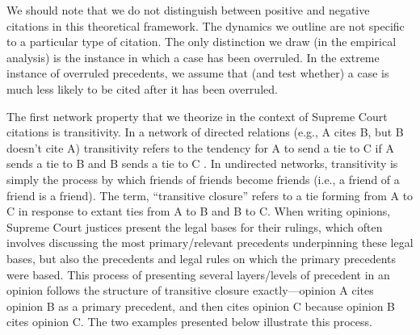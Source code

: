 \documentclass{cup-pan}
\begin{document}
We should note that we do not distinguish between positive and negative citations in this theoretical framework. The dynamics we outline are not specific to a particular type of citation. The only distinction we draw (in the empirical analysis) is the instance in which a case has been overruled. In the extreme instance of overruled precedents, we assume that (and test whether) a case is much less likely to be cited after it has been overruled.

The first network property that we theorize in the context of Supreme Court citations is transitivity. In a network of directed relations (e.g., A cites B, but B doesn't cite A) transitivity refers to the tendency for A to send a tie to C if A sends a tie to B and B sends a tie to C \citep{holland1971transitivity}. In undirected networks, transitivity is simply the process by which friends of friends become friends (i.e., a friend of a friend is a friend). The term, ``transitive closure'' refers to a tie forming from A to C in response to extant ties from A to B and B to C. When writing opinions, Supreme Court justices present the legal bases for their rulings, which often involves discussing the most primary/relevant precedents underpinning these legal bases, but also the precedents and legal rules on which the primary precedents were based. This process of presenting several layers/levels of precedent in an opinion follows the structure of transitive closure exactly---opinion A cites opinion B as a primary precedent, and then cites opinion C because opinion B cites opinion C. The two examples presented below illustrate this process.
\end{document}
